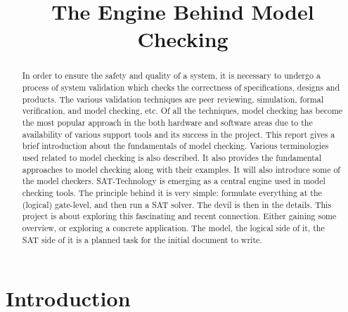 \documentclass{article}
\begin{document}
\title{The Engine Behind Model Checking}

\maketitle

\begin{abstract}
In order to ensure the safety and quality of a system, it is necessary to undergo a process of system validation which checks the correctness of specifications, designs and products. The various validation techniques are peer reviewing, simulation, formal verification, and model checking, etc. Of all the techniques, model checking has become the most popular approach in the both hardware and software areas due to the availability of various support tools and its success in the project. This report gives a brief introduction about the fundamentals of model checking. Various terminologies used related to model checking is also described. It also provides the fundamental approaches to model checking along with their examples. It will also introduce some of the model checkers. SAT-Technology is emerging as a central engine used in model checking tools. The principle behind it is very simple: formulate everything at the (logical) gate-level, and then run a SAT solver. The devil is then in the details. This project is about exploring this fascinating and recent connection. Either gaining some overview, or exploring a concrete application. The model, the logical side of it, the SAT side of it is a planned task for the initial document to write.

\end{abstract}

\tableofcontents



\section{Introduction}
\label{sec:intro}
\end{document}
